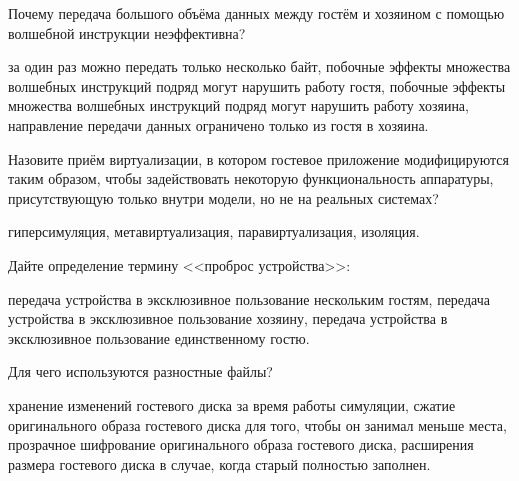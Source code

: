 \begin{questions}

\question[3] Почему передача большого объёма данных между гостём и хозяином с помощью волшебной инструкции неэффективна?
\begin{choices}
\correctchoice за один раз можно передать только несколько байт,
\choice побочные эффекты множества волшебных инструкций подряд могут нарушить работу гостя,
\choice побочные эффекты множества волшебных инструкций подряд могут нарушить работу хозяина,
\choice направление передачи данных ограничено только из гостя в хозяина.
\end{choices}

\question[3] Назовите приём виртуализации, в котором гостевое приложение модифицируются таким образом, чтобы задействовать некоторую функциональность аппаратуры, присутствующую только внутри модели, но не на реальных системах?
\begin{choices}
\choice гиперсимуляция,
\choice метавиртуализация,
\correctchoice  паравиртуализация,
\choice изоляция.
\end{choices}

\question[3] Дайте определение термину <<проброс устройства>>:
\begin{choices}
\choice передача устройства в эксклюзивное пользование нескольким гостям,
\choice передача устройства в эксклюзивное пользование хозяину,
\correctchoice передача устройства в эксклюзивное пользование единственному гостю.
\end{choices}

\question[3] Для чего используются разностные файлы?
\begin{choices}
\correctchoice хранение изменений гостевого диска за время работы симуляции,
\choice сжатие оригинального образа гостевого диска для того, чтобы он занимал меньше места,
\choice прозрачное шифрование оригинального образа гостевого диска,
\choice расширения размера гостевого диска в случае, когда старый полностью заполнен.
\end{choices}

\end{questions}


